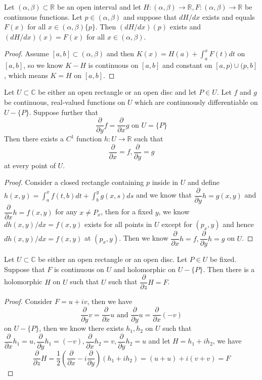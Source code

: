 \documentclass[lang=en, color=blue, ]{elegantbook}
\newcommand{\R}{\mathbb{R}}
\newcommand{\C}{\mathbb{C}}
\newcommand{\ParZ}{\dfrac{\partial}{\partial z}}
\newcommand{\ParX}{\dfrac{\partial}{\partial x}}
\newcommand{\ParY}{\dfrac{\partial}{\partial y}}
\begin{document}
\begin{lemma}
    Let $(\alpha,\beta)\subset\R$ be an open interval and let $H:(\alpha,\beta)\to\R, F:(\alpha,\beta)\to\R$ be continuous functions. Let $p\in(\alpha,\beta)$ and suppose that $dH/dx$ exists and equals $F(x)$ for all $x\in(\alpha,\beta)\{p\}$. Then $(dH/dx)(p)$ exists and $(dH/dx)(x) = F(x)$ for all $x\in(\alpha,\beta)$.
\end{lemma}
\begin{proof}\par
    Assume $[a,b]\subset (\alpha,\beta)$ and then $K(x) = H(a) + \int_a^x F(t)dt$ on $[a,b]$, so we know $K-H$ is continuous on $[a,b]$ and constant on $[a,p)\cup(p,b]$, which means $K=H$ on $[a,b]$.
\end{proof}

\begin{theorem}
    Let $U\subset \C$ be either an open rectangle or an open disc and let $P\in U$. Let $f$ and $g$ be continuous, real-valued functions on $U$ which are continuously differentiable on $U-\{P\}$. Suppose further that
    \[\ParY f = \ParX g\text{ on }U=\{P\}\]
    Then there exists a $C^1$ function $h:U\to\R$ such that
    \[\ParX = f, \ParY = g\]
    at every point of $U$.
\end{theorem}
\begin{proof}\par
    Consider a closed rectangle containing $p$ inside in $U$ and define $h(x,y) = \int_a^x f(t,b)dt + \int_b^y g(x,s)ds$ and we know that $\ParY h = g(x,y)$ and $\ParX h = f(x,y)$ for any $x\neq P_x$, then for a fixed $y$, we know $dh(x,y)/dx= f(x,y)$ exists for all points in $U$ except for $(p_x,y)$ and hence $dh(x,y)/dx = f(x,y)$ at $(p_x,y)$. Then we know $\ParX h = f, \ParY h = g$ on $U$.
\end{proof}

\begin{theorem}
    Let $U\subset\C$ be either an open rectangle or an open disc. Let $P\in U$ be fixed. Suppose that $F$ is continuous on $U$ and holomorphic on $U-\{P\}$. Then there is a holomorphic $H$ on $U$ such that $U$ such that $\ParZ H = F$.    
\end{theorem}
\begin{proof}\par
    Consider $F = u+iv$, then we have
    \[\ParY v = \ParX u\text{ and } \ParY u = \ParX (-v)\]
    on $U-\{P\}$, then we know there exists $h_1,h_2$ on $U$ such that $\ParX h_1 = u, \ParY h_1 = (-v), \ParX h_2 = v, \ParY h_2 = u$
    and let $H = h_1 + ih_2$, we have
    \[
    \ParZ H = \dfrac{1}{2}(\ParX - i\ParY)(h_1+ih_2) = (u+u) + i(v+v) = F
    \]
\end{proof}
\end{document}
